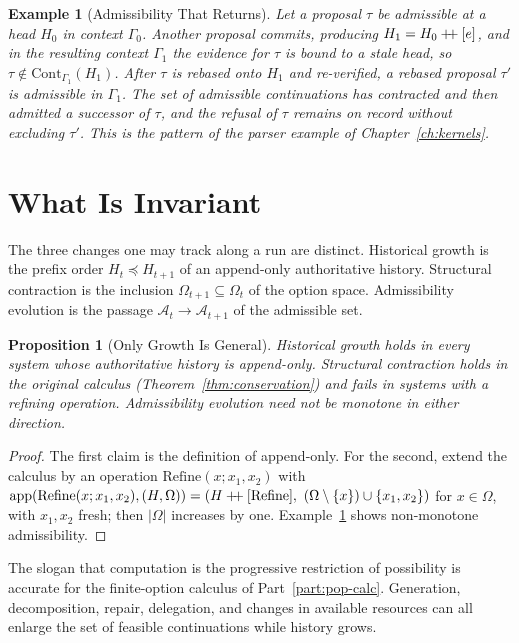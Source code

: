 \documentclass[12pt,oneside,openany]{book}
\theoremstyle{spherepop}
\newtheorem{proposition}[definition]{Proposition}
\theoremstyle{remarkstyle}
\newtheorem{example}[definition]{Example}
\newcommand{\hconcat}{\mathbin{+\mkern-5mu+}}
\begin{document}
\begin{example}[Admissibility That Returns]
\label{ex:returns}
Let a proposal $\tau$ be admissible at a head $H_0$ in context $\Gamma_0$. Another proposal commits, producing $H_1=H_0\hconcat[e]$, and in the resulting context $\Gamma_1$ the evidence for $\tau$ is bound to a stale head, so $\tau\notin\mathrm{Cont}_{\Gamma_1}(H_1)$. After $\tau$ is rebased onto $H_1$ and re-verified, a rebased proposal $\tau'$ is admissible in $\Gamma_1$. The set of admissible continuations has contracted and then admitted a successor of $\tau$, and the refusal of $\tau$ remains on record without excluding $\tau'$. This is the pattern of the parser example of Chapter~\ref{ch:kernels}.
\end{example}

\section{What Is Invariant}

The three changes one may track along a run are distinct. Historical growth is the prefix order $H_t\preceq H_{t+1}$ of an append-only authoritative history. Structural contraction is the inclusion $\Omega_{t+1}\subseteq\Omega_t$ of the option space. Admissibility evolution is the passage $\mathcal A_t\to\mathcal A_{t+1}$ of the admissible set.

\begin{proposition}[Only Growth Is General]
Historical growth holds in every system whose authoritative history is append-only. Structural contraction holds in the original calculus (Theorem~\ref{thm:conservation}) and fails in systems with a refining operation. Admissibility evolution need not be monotone in either direction.
\end{proposition}

\begin{proof}
The first claim is the definition of append-only. For the second, extend the calculus by an operation $\mathrm{Refine}(x;x_1,x_2)$ with $\mathrm{app}(\mathrm{Refine}(x;x_1,x_2),(H,\Omega))=(H\hconcat[\mathrm{Refine}],\ (\Omega\setminus\{x\})\cup\{x_1,x_2\})$ for $x\in\Omega$, with $x_1,x_2$ fresh; then $|\Omega|$ increases by one. Example~\ref{ex:returns} shows non-monotone admissibility.
\end{proof}

The slogan that computation is the progressive restriction of possibility is accurate for the finite-option calculus of Part~\ref{part:pop-calc}. Generation, decomposition, repair, delegation, and changes in available resources can all enlarge the set of feasible continuations while history grows.
\end{document}
